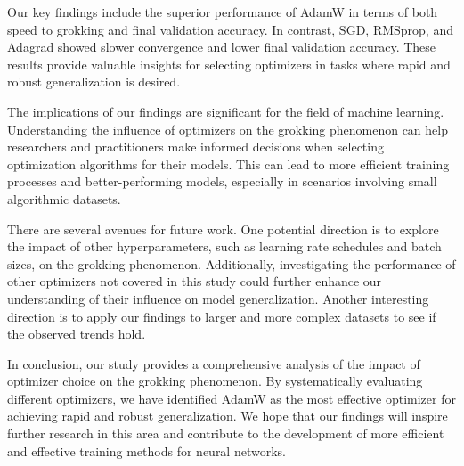 \documentclass{article} %
\begin{document}
Our key findings include the superior performance of AdamW in terms of both speed to grokking and final validation accuracy. In contrast, SGD, RMSprop, and Adagrad showed slower convergence and lower final validation accuracy. These results provide valuable insights for selecting optimizers in tasks where rapid and robust generalization is desired.

The implications of our findings are significant for the field of machine learning. Understanding the influence of optimizers on the grokking phenomenon can help researchers and practitioners make informed decisions when selecting optimization algorithms for their models. This can lead to more efficient training processes and better-performing models, especially in scenarios involving small algorithmic datasets.

There are several avenues for future work. One potential direction is to explore the impact of other hyperparameters, such as learning rate schedules and batch sizes, on the grokking phenomenon. Additionally, investigating the performance of other optimizers not covered in this study could further enhance our understanding of their influence on model generalization. Another interesting direction is to apply our findings to larger and more complex datasets to see if the observed trends hold.

In conclusion, our study provides a comprehensive analysis of the impact of optimizer choice on the grokking phenomenon. By systematically evaluating different optimizers, we have identified AdamW as the most effective optimizer for achieving rapid and robust generalization. We hope that our findings will inspire further research in this area and contribute to the development of more efficient and effective training methods for neural networks.



\end{document}
